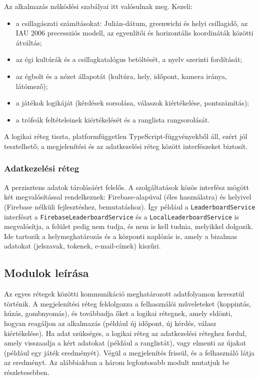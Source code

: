 \documentclass[12pt,a4paper]{article}
\newcommand{\kod}[1]{\texttt{\small #1}}
\begin{document}
Az alkalmazás működési szabályai itt valósulnak meg. Kezeli:

\begin{itemize}
  \item a csillagászati számításokat: Julián-dátum, greenwichi és helyi csillagidő, az IAU 2006
        precessziós modell, az egyenlítői és horizontális koordináták közötti átváltás;
  \item az égi kultúrák és a csillagkatalógus betöltését, a nyelv szerinti fordítását;
  \item az égbolt és a nézet állapotát (kultúra, hely, időpont, kamera iránya, látómező);
  \item a játékok logikáját (kérdések sorsolása, válaszok kiértékelése, pontszámítás);
  \item a trófeák feltételeinek kiértékelését és a ranglista rangsorolását.
\end{itemize}

A logikai réteg tiszta, platformfüggetlen TypeScript-függvényekből áll, ezért jól tesztelhető;
a megjelenítési és az adatkezelési réteg között interfészeket biztosít.

\subsubsection{Adatkezelési réteg}

A perzisztens adatok tárolásáért felelős. A szolgáltatások közös interfész mögött két
megvalósítással rendelkeznek: Firebase-alapúval (éles használatra) és helyivel (Firebase
nélküli fejlesztéshez, bemutatáshoz). Így például a \kod{LeaderboardService} interfészt a
\kod{FirebaseLeaderboardService} és a \kod{LocalLeaderboardService} is megvalósítja, a felület
pedig nem tudja, és nem is kell tudnia, melyikkel dolgozik. Ide tartozik a helymeghatározás és a
központi naplózás is, amely a bizalmas adatokat (jelszavak, tokenek, e-mail-címek) kiszűri.

\subsection{Modulok leírása}

Az egyes rétegek közötti kommunikáció meghatározott adatfolyamon keresztül történik. A
megjelenítési réteg feldolgozza a felhasználói műveleteket (koppintás, húzás, gombnyomás), és
továbbadja őket a logikai rétegnek, amely eldönti, hogyan reagáljon az alkalmazás (például új
időpont, új kérdés, válasz kiértékelése). Ha adat szükséges, a logikai réteg az adatkezelési
réteghez fordul, amely visszaadja a kért adatokat (például a ranglistát), vagy elmenti az újakat
(például egy játék eredményét). Végül a megjelenítés frissül, és a felhasználó látja az
eredményt. Az alábbiakban a három legfontosabb modult mutatjuk be részletesebben.
\end{document}

